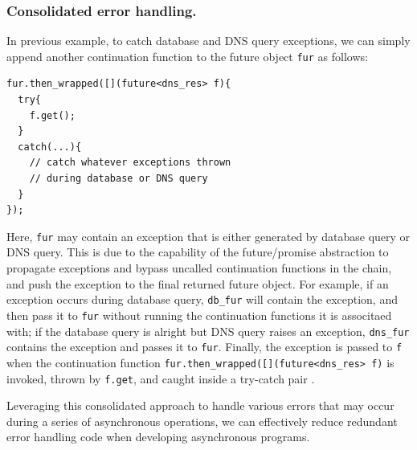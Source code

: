 
\subsubsection{Consolidated error handling.}
\label{sec:consolidated-error-handling}
In previous example, to catch database and DNS query exceptions, we can simply append another continuation function to the future object \lstinline[style=InlineStyle]{fur} as follows:

\begin{lstlisting}[style=InlineStyle]
fur.then_wrapped([](future<dns_res> f){
  try{
    f.get();
  }
  catch(...){
    // catch whatever exceptions thrown
    // during database or DNS query
  }
});
\end{lstlisting}

\noindent Here, \lstinline[style=InlineStyle]{fur} may contain an exception that is either generated by database query or DNS query. This is due to the capability of the future/promise abstraction to propagate exceptions and bypass uncalled continuation functions in the chain, and push the exception to the final returned future object. For example, if an exception occurs during database query, \lstinline[style=InlineStyle]{db_fur} will contain the exception, and then pass it to \lstinline[style=InlineStyle]{fur} without running the continuation functions it is associtaed with; if the database query is alright but DNS query raises an exception, \lstinline[style=InlineStyle]{dns_fur} contains the exception and passes it to \lstinline[style=InlineStyle]{fur}. Finally, the exception is passed to \lstinline[style=InlineStyle]{f} when the continuation function \lstinline[style=InlineStyle]{fur.then_wrapped([](future<dns_res> f)} is invoked, thrown by \lstinline[style=InlineStyle]{f.get}, and caught inside a try-catch pair \cite{cppexception}.

Leveraging this consolidated approach to handle various errors that may occur during a series of asynchronous operations, we can effectively reduce redundant error handling code when developing asynchronous programs.

